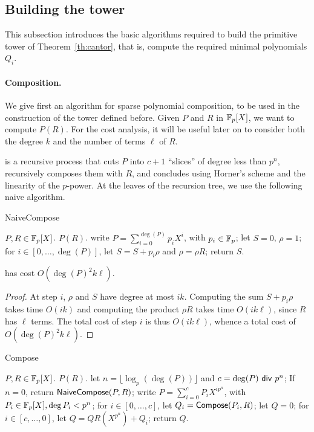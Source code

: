 

\subsection{Building the tower}

This subsection introduces the basic algorithms required to build the
primitive tower of Theorem~\ref{th:cantor}, that is, compute the
required minimal polynomials $Q_i$.

\paragraph{Composition.} We give first an algorithm for sparse
polynomial composition, to be used in the construction of the tower
defined before.  Given $P$ and $R$ in $\mathbb{F}_p[X]$, we want to compute
$P(R)$. For the cost analysis, it will be useful later on to consider
both the degree $k$ and the number of terms $\ell$ of $R$.

 is a recursive process that cuts $P$ into $c+1$
``slices'' of degree less than $p^n$, recursively composes them with
$R$, and concludes using Horner's scheme and the linearity of the
$p$-power. At the leaves of the recursion tree, we use the following naive
algorithm.

\begin{algorithm}
  \caption{NaiveCompose}
  \begin{algorithmic}[1]
    \REQUIRE $P,R\in\mathbb{F}_p[X]$.
    \ENSURE $P(R)$.
    \STATE write $P=\sum_{i=0}^{\deg(P)} p_i X^{i}$, with $p_i \in \mathbb{F}_p$;
    \STATE let $S=0$, $\rho=1$;
    \STATE for $i\in [0,\dots,\deg(P)]$, let $S=S+p_i \rho$ and $\rho =\rho R$;
    \STATE return $S$.
  \end{algorithmic}
\end{algorithm}

\begin{lemma}
   has cost $O(\deg(P)^2k\ell)$.  
\end{lemma}
\begin{proof} At step $i$, $\rho$ and $S$ have degree at most
$ik$. Computing the sum $S + p_i \rho$ takes time $O(ik)$ and
computing the product $\rho R$ takes time $O(ik\ell)$, since $R$ has
$\ell$ terms. The total cost of step $i$ is thus $O(ik\ell)$, 
whence a total cost of $O(\deg(P)^2 k\ell)$.
\end{proof}


\begin{algorithm}
  \caption{Compose}
  \begin{algorithmic}[1]
    \REQUIRE $P,R\in\mathbb{F}_p[X]$.
    \ENSURE $P(R)$.
    \STATE\label{c:params} let $n=\lfloor \log_p(\deg(P)) \rfloor$ and $c=\deg(P) {\sf~div~} p^n$;
    \STATE If $n=0$, return ${\sf NaiveCompose}(P,R)$;
    \STATE write $P=\sum_{i=0}^{c} P_i X^{ip^n}$, with $P_i \in \mathbb{F}_p[X], \deg P_i<p^n$;
    \STATE for $i\in [0,\dots,c]$, let $Q_i = \text{{\sf Compose}}(P_i,R)$;
    \STATE let $Q=0$;
    \STATE\label{c:loop} for $i\in [c,\dots,0]$, let $Q = Q R(X^{p^n})  + Q_i$;
    \STATE return $Q$.
  \end{algorithmic}
\end{algorithm}


